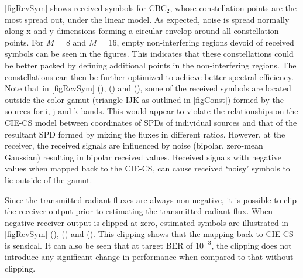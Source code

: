 \documentclass[10pt,letterpaper]{article}
\begin{document}
\figurename{ }\ref{figRcvSym} shows received symbols for CBC$_{2}$, whose constellation points are the most spread out, under the linear model. As expected, noise is spread normally along x and y dimensions forming a circular envelop around all constellation points. For $M$ = 8 and $M$ = 16, empty non-interfering regions devoid of received symbols can be seen in the figures. This indicates that these constellations could be better packed by defining additional points in the non-interfering regions. The constellations can then be further optimized to achieve better spectral efficiency. Note that in \figurename{ }\ref{figRcvSym} (),
() and (), some of the received
symbols are located outside the color gamut (triangle IJK
as outlined in \figurename{ }\ref{figConst}) formed by the sources for
i, j and k bands. This would appear to violate the relationships on the CIE-CS model between coordinates of SPDs of individual sources and that of the resultant SPD formed by mixing the fluxes in different ratios. However, at the receiver, the
received signals are influenced by noise (bipolar, zero-mean Gaussian)
resulting in bipolar received values. Received signals with negative values when mapped back to the CIE-CS, can cause received `noisy' symbols to lie outside of the gamut.

Since the transmitted radiant fluxes are always non-negative, it is possible to clip the receiver output prior to estimating the transmitted
radiant flux.  When negative receiver output is clipped at zero, estimated
symbols are illustrated in
\figurename{ }\ref{figRcvSym} (),
() and (). This
clipping shows that the mapping back to CIE-CS is sensical. It can also be seen that at target BER of $10^{-3}$, the clipping does not
introduce any significant change in performance when compared to that without clipping.
\end{document}
